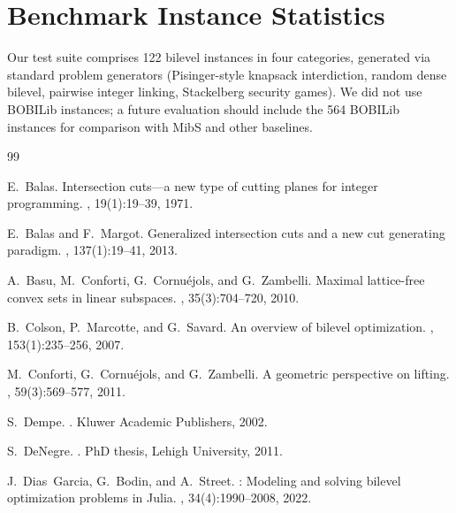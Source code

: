 \documentclass[11pt]{article}
\begin{document}
\section{Benchmark Instance Statistics}
\label{app:instances}

Our test suite comprises 122 bilevel instances in four categories, generated
via standard problem generators (Pisinger-style knapsack interdiction,
random dense bilevel, pairwise integer linking, Stackelberg security games).
We did not use BOBILib instances; a future evaluation should include the
564 BOBILib instances for comparison with MibS and other baselines.



\begin{thebibliography}{99}

E.~Balas.
\newblock Intersection cuts---a new type of cutting planes for integer
  programming.
, 19(1):19--39, 1971.

E.~Balas and F.~Margot.
\newblock Generalized intersection cuts and a new cut generating paradigm.
, 137(1):19--41, 2013.

A.~Basu, M.~Conforti, G.~Cornu{\'e}jols, and G.~Zambelli.
\newblock Maximal lattice-free convex sets in linear subspaces.
, 35(3):704--720, 2010.

B.~Colson, P.~Marcotte, and G.~Savard.
\newblock An overview of bilevel optimization.
, 153(1):235--256, 2007.

M.~Conforti, G.~Cornu{\'e}jols, and G.~Zambelli.
\newblock A geometric perspective on lifting.
, 59(3):569--577, 2011.

S.~Dempe.
.
\newblock Kluwer Academic Publishers, 2002.

S.~DeNegre.
.
\newblock PhD thesis, Lehigh University, 2011.

J.~Dias~Garcia, G.~Bodin, and A.~Street.
: Modeling and solving bilevel optimization problems
  in {Julia}.
, 34(4):1990--2008, 2022.


\end{thebibliography}
\end{document}
